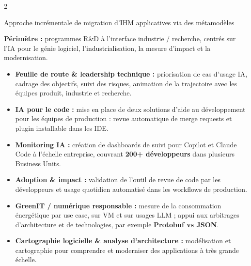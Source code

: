 \documentclass[10pt,a4paper,ragged2e,withhyper]{altacv}
\newif\iflongcv
\begin{document}
\begin{paracol}{2}

Approche incrémentale de migration d’IHM applicatives via des métamodèles

\divider


\divider



\end{paracol}

\iflongcv
\newpage




\textbf{Périmètre :} programmes R\&D à l’interface industrie / recherche, centrés sur l’IA pour le génie logiciel, l’industrialisation, la mesure d’impact et la modernisation.

\begin{itemize}
\item \textbf{Feuille de route \& leadership technique :} priorisation de cas d’usage IA, cadrage des objectifs, suivi des risques, animation de la trajectoire avec les équipes produit, industrie et recherche.
\item \textbf{IA pour le code :} mise en place de deux solutions d’aide au développement pour les équipes de production : revue automatique de merge requests et plugin installable dans les IDE.
\item \textbf{Monitoring IA :} création de dashboards de suivi pour Copilot et Claude Code à l’échelle entreprise, couvrant \textbf{200+ développeurs} dans plusieurs Business Units.
\item \textbf{Adoption \& impact :} validation de l’outil de revue de code par les développeurs et usage quotidien automatisé dans les workflows de production.
\item \textbf{GreenIT / numérique responsable :} mesure de la consommation énergétique par use case, sur VM et sur usages LLM ; appui aux arbitrages d’architecture et de technologies, par exemple \textbf{Protobuf vs JSON}.
\item \textbf{Cartographie logicielle \& analyse d’architecture :} modélisation et cartographie pour comprendre et moderniser des applications à très grande échelle.
\end{itemize}
\end{document}
